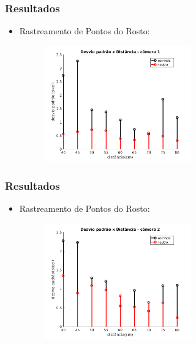 \documentclass[brazil]{beamer}
\begin{document}
\begin{frame}
\frametitle{Resultados}
  \begin{itemize}
      \item Rastreamento de Pontos do Rosto:
      
       \begin{figure}
        \centering
        \includegraphics[width = 0.6\textwidth, keepaspectratio]{./img/desvio_cameraEsquerda.jpg}
      \end{figure}
          
  \end{itemize} 
\end{frame}

\begin{frame}
\frametitle{Resultados}
  \begin{itemize}
      \item Rastreamento de Pontos do Rosto:
      
       \begin{figure}
        \centering
        \includegraphics[width = 0.6\textwidth, keepaspectratio]{./img/desvio_cameraDireita.jpg}
      \end{figure}
          
  \end{itemize} 
\end{frame}
\end{document}
